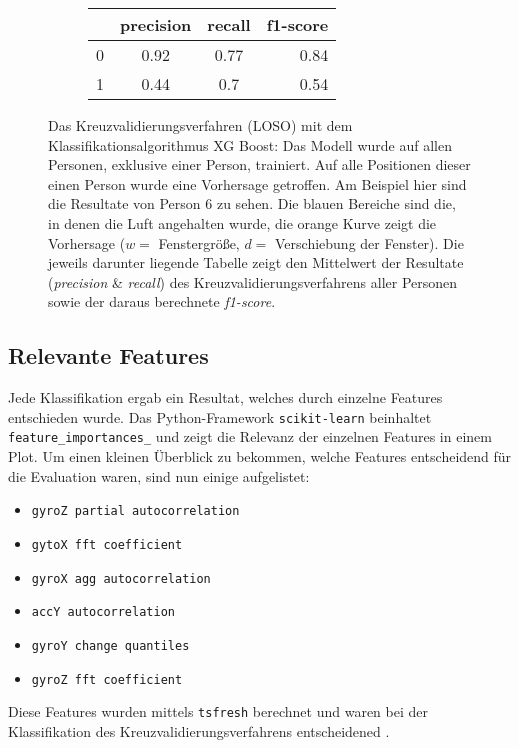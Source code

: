 \begin{figure}[ht!]
  \begin{subfigure}{1\textwidth}
      \begin{center}
          \begin{tabular}{ | l | c | c | r | }
            \hline
             & precision & recall & f1-score \\ \hline
            0 & 0.92 & 0.77 & 0.84 \\ \hline
            1 & 0.44 & 0.7  & 0.54 \\
            \hline
          \end{tabular}
      \end{center}
  \end{subfigure}
    \caption{Das Kreuzvalidierungsverfahren (LOSO) mit dem Klassifikationsalgorithmus XG Boost: Das Modell wurde auf allen Personen, exklusive einer Person, trainiert. Auf alle Positionen dieser einen Person wurde eine Vorhersage getroffen. Am Beispiel hier sind die Resultate von Person 6 zu sehen. Die blauen Bereiche sind die, in denen die Luft angehalten wurde, die orange Kurve zeigt die Vorhersage ($w=$ Fenstergröße, $d=$ Verschiebung der Fenster). Die jeweils darunter liegende Tabelle zeigt den Mittelwert der Resultate (\textit{precision} \& \textit{recall}) des Kreuzvalidierungsverfahrens aller Personen sowie der daraus berechnete \textit{f1-score}.}
\label{evaluation:xgboost_loso:person6}
\end{figure}

\newpage

\subsection{Relevante Features}
Jede Klassifikation ergab ein Resultat, welches durch einzelne Features entschieden wurde. 
Das Python-Framework \texttt{scikit-learn} beinhaltet \texttt{feature\_importances\_} und zeigt die Relevanz der einzelnen Features in einem Plot.
Um einen kleinen Überblick zu bekommen, welche Features entscheidend für die Evaluation waren, sind nun einige aufgelistet:
\begin{itemize}
    \item \texttt{gyroZ partial autocorrelation}
    \item \texttt{gytoX fft coefficient}
    \item \texttt{gyroX agg autocorrelation}
    \item \texttt{accY autocorrelation}
    \item \texttt{gyroY change quantiles }
    \item \texttt{gyroZ fft coefficient}
\end{itemize}
Diese Features wurden mittels \texttt{tsfresh} berechnet und waren bei der Klassifikation des Kreuzvalidierungsverfahrens entscheidened \cite{TsfreshTsfresh12}.

